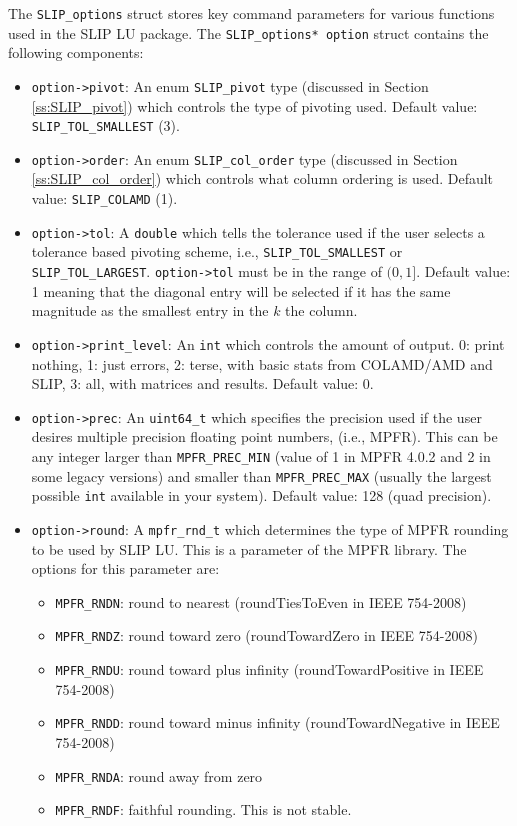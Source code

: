 \documentclass[12pt]{article}
\theoremstyle{definition}
\begin{document}
The \verb|SLIP_options| struct stores key command parameters for various
functions used in the SLIP LU package. The \verb|SLIP_options* option| struct
contains the following components:

\begin{itemize}
\item
\verb|option->pivot|: An enum \verb|SLIP_pivot| type (discussed in Section
\ref{ss:SLIP_pivot}) which controls the type of pivoting used. Default value:
\verb|SLIP_TOL_SMALLEST| (3).

\item
\verb|option->order|: An enum \verb|SLIP_col_order| type (discussed in Section
\ref{ss:SLIP_col_order}) which controls what column ordering is used. Default
value: \verb|SLIP_COLAMD| (1).

\item
\verb|option->tol|: A \verb|double| which tells the tolerance used if the user
selects a tolerance based pivoting scheme, i.e., \verb|SLIP_TOL_SMALLEST| or
\verb|SLIP_TOL_LARGEST|. \verb|option->tol| must be in the range of $(0,1]$.
Default value: 1 meaning that the diagonal entry will be selected if it has the
same magnitude as the smallest entry in the $k$ the column.

\item
\verb|option->print_level|: An \verb|int| which controls the amount of
output. 0: print nothing, 1: just errors, 2: terse, with basic stats from
COLAMD/AMD and SLIP, 3: all, with matrices and results. Default value: 0.

\item
\verb|option->prec|: An \verb|uint64_t| which specifies the precision used if
the user desires multiple precision floating point numbers, (i.e., MPFR). This
can be any integer larger than \verb|MPFR_PREC_MIN| (value of 1 in MPFR 4.0.2
and 2 in some legacy versions) and smaller than \verb|MPFR_PREC_MAX| (usually
the largest possible \verb'int' available in your system). Default value: 128
(quad precision).

\item
\verb|option->round|: A \verb|mpfr_rnd_t| which determines the type
of MPFR rounding to be used by SLIP LU. This is a parameter of the MPFR
library. The options for this parameter are:

    \begin{itemize}
        \item \verb|MPFR_RNDN|: round to nearest
            (roundTiesToEven in IEEE 754-2008)
        \item \verb|MPFR_RNDZ|: round toward zero
            (roundTowardZero in IEEE 754-2008)
        \item \verb|MPFR_RNDU|: round toward plus infinity
            (roundTowardPositive in IEEE 754-2008)
        \item \verb|MPFR_RNDD|: round toward minus infinity
            (roundTowardNegative in IEEE 754-2008)
        \item \verb|MPFR_RNDA|: round away from zero
        \item \verb|MPFR_RNDF|: faithful rounding. This is not stable.
    \end{itemize}


\end{itemize}
\end{document}

